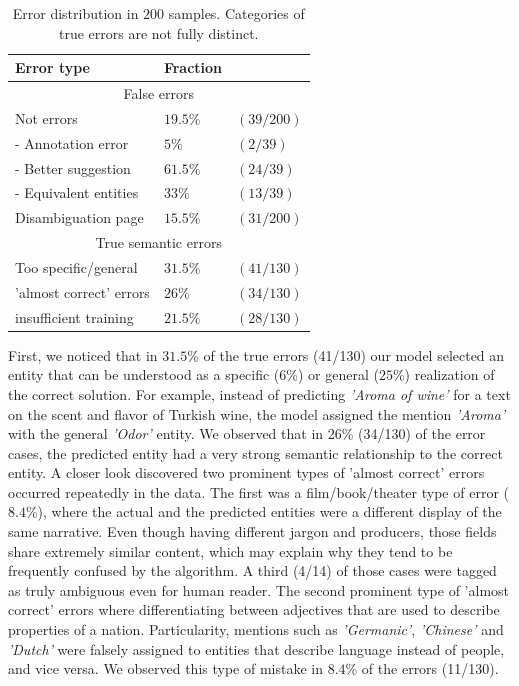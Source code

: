 \documentclass[11pt]{article}
\begin{document}
	\begin{table}[ht]
		\begin{center}
			\begin{tabular}{|p{3.5cm}| ll |}
				\hline \bf Error type 		& \bf Fraction  	&\\ 
				\hline \multicolumn{3}{|c|}{False errors} \\
				\hline Not errors 			& $19.5\%$ 	& $(39/200)$  \\ 
				- Annotation error 			& $5\%$    	& $(2/39)$ \\ 
				- Better suggestion			& $61.5\%$ 	&$(24/39)$ \\
			    - Equivalent entities		& $ 33\%$ 	&$(13/39)$ \\ 
				Disambiguation page			& $15.5\%$   	&$(31/200)$ \\ 
				\hline \multicolumn{3}{|c|}{True semantic errors} \\
				\hline	Too specific/general  	& $31.5\%$ 	&$(41/130)$ \\ 
				'almost correct' errors		& $26\%$ 	&$(34/130)$ \\ 
				insufficient training		& $21.5\%$ &$(28/130)$ \\
				\hline
			\end{tabular}
		\end{center}
		\caption{\label{tab:d} Error distribution in $200$ samples. Categories of true errors are not fully distinct.}
	\end{table}
	
	First, we noticed that in $31.5$\% of the true errors (41/130) our model selected an entity that can be understood as a specific ($6$\%) or general ($25$\%) realization of the correct solution. For example, instead of predicting \textit{'Aroma of wine'} for a text on the scent and flavor of Turkish wine, the model assigned the mention \textit{'Aroma'} with the general \textit{'Odor'} entity. We observed that in $26$\% (34/130) of the error cases, the predicted entity had a very strong semantic relationship to the correct entity. A closer look discovered two prominent types of 'almost correct' errors occurred repeatedly in the data. The first was a film/book/theater type of error ($8.4$\%), where the actual and the predicted entities were a different display of the same narrative. Even though having different jargon and producers, those fields share extremely similar content, which may explain why they tend to be frequently confused by the algorithm. A third (4/14) of those cases were tagged as truly ambiguous even for human reader. The second prominent type of 'almost correct' errors where differentiating between adjectives that are used to describe properties of a nation. Particularity, mentions such as \textit{'Germanic'}, \textit{'Chinese'} and \textit{'Dutch'} were falsely assigned to entities that describe language instead of people, and vice versa. We observed this type of mistake in $8.4$\% of the errors (11/130).
	
\end{document}
